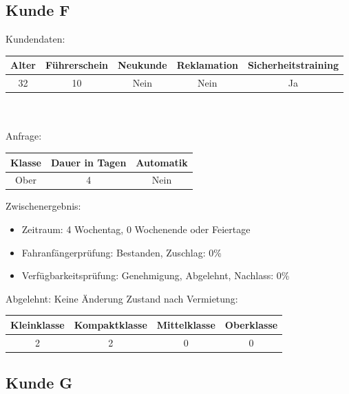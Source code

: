 \subsection{Kunde F}

Kundendaten:\\
\begin{tabular}{|c|c|c|c|c|}
	\hline \textbf{Alter} & \textbf{Führerschein} & \textbf{Neukunde} & \textbf{Reklamation} & \textbf{Sicherheitstraining} \\ 
	\hline 32 & 10 & Nein & Nein & Ja \\ 
	\hline 
\end{tabular} 
\\\\
Anfrage:\\
\begin{tabular}{|c|c|c|}
	\hline \textbf{Klasse} & \textbf{Dauer in Tagen} & \textbf{Automatik} \\ 
	\hline Ober & 4 & Nein \\ 
	\hline 
\end{tabular}

Zwischenergebnis:
\begin{itemize}
	\item Zeitraum: 4 Wochentag, 0 Wochenende oder Feiertage
	\item Fahranfängerprüfung: Bestanden, Zuschlag: 0\%
	\item Verfügbarkeitsprüfung: Genehmigung, Abgelehnt, Nachlass: 0\%
	
\end{itemize}

Abgelehnt: Keine Änderung
Zustand nach Vermietung:\\
\begin{tabular}{|c|c|c|c|}
	\hline \textbf{Kleinklasse} & \textbf{Kompaktklasse} & \textbf{Mittelklasse} & \textbf{Oberklasse}  \\ 
	\hline 2 & 2 & 0 & 0 \\ 
	\hline 
\end{tabular}

\subsection{Kunde G}

